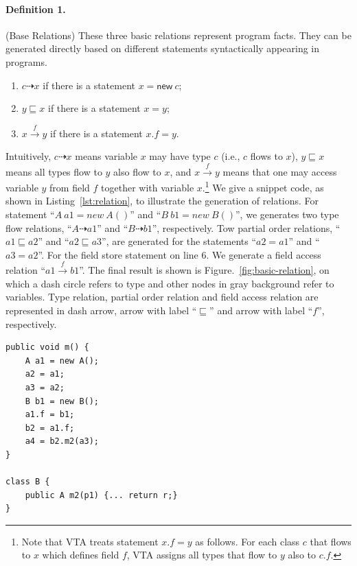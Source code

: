 \documentclass{fac}
\newcommand{\keyword}[1]{\mathsf{#1}}
\newcommand{\kwnew}[0]{\keyword{new}}
\newcommand{\less}{\sqsubseteq}
\newcommand{\tflow}{\dashrightarrow}
\newcommand{\hflow}{\longrightarrow}
\newcommand{\lhflow}[1]{\stackrel{#1}{\hflow}}
\begin{document}
\paragraph{Definition 1.}\label{def:base} (Base Relations)
These three basic relations represent program facts. They can be generated directly based on different statements syntactically appearing in programs.
\begin{enumerate}
  \item $c\tflow x$ if there is a statement $x = \kwnew\ c$;
  \item $y\less x$ if there is a statement $x = y $;
  \item $x\lhflow{f}y$ if there is a statement $x.f = y$.
\end{enumerate}
Intuitively, $c\tflow x$ means variable $x$ may have type $c$ (i.e., $c$ flows to $x$), $y\less x$ means all types flow to $y$ also flow to $x$, and $x\lhflow{f}y$ means that one may access variable $y$ from field $f$ together with variable $x$.\footnote{Note that VTA treats statement $x.f = y$ as follows. For each class $c$ that flows to $x$ which defines field $f$, VTA assigns all types that flow to $y$ also to $c.f$.}
We give a snippet code, as shown in Listing~\ref{lst:relation}, to illustrate the generation of relations. For statement ``$A\ a1=new \ A()$'' and ``$B\ b1=new\ B()$'', we generates two type flow relations, ``$A \tflow a1$'' and ``$B \tflow b1$'', respectively. Tow partial order relations, ``$a1 \less a2$'' and ``$a2 \less a3$'', are generated for the statements ``$a2=a1$'' and ``$a3=a2$''. For the field store statement on line 6. We generate a field access relation ``$a1 \lhflow{f} b1$''. The final result is shown is Figure.~\ref{fig:basic-relation}, on which a dash circle refers to type and other nodes in gray background refer to variables. Type relation, partial order relation and field access relation are represented in dash arrow, arrow with label ``$\less$'' and arrow with label ``$f$'', respectively. 
\begin{minipage}{\linewidth}
\vspace{10pt}
\begin{lstlisting}[caption={Example for generation of relations},label={lst:relation}]
public void m() {
	A a1 = new A();
	a2 = a1;
	a3 = a2;
	B b1 = new B();
	a1.f = b1;
	b2 = a1.f;
	a4 = b2.m2(a3);
}

class B {
	public A m2(p1) {... return r;}
}
\end{lstlisting}
\end{minipage}
\end{document}
